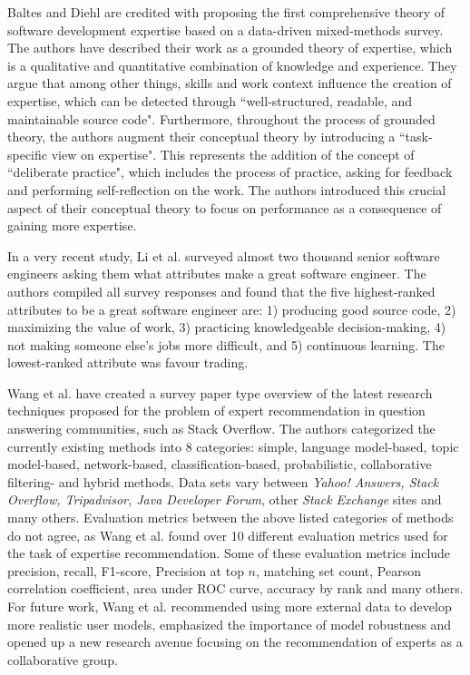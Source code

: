         Baltes and Diehl \cite{baltes2018towards} are credited with proposing the first comprehensive theory of software development expertise based on a data-driven mixed-methods survey. The authors have described their work as a grounded theory of expertise, which is a qualitative and quantitative combination of knowledge and experience. They argue that among other things, skills and work context influence the creation of expertise, which can be detected through ``well-structured, readable, and maintainable source code". Furthermore, throughout the process of grounded theory, the authors augment their conceptual theory by introducing a ``task-specific view on expertise". This represents the addition of the concept of ``deliberate practice", which includes the process of practice, asking for feedback and performing self-reflection on the work. The authors introduced this crucial aspect of their conceptual theory to focus on performance as a consequence of gaining more expertise.
        
        In a very recent study, Li et al. \cite{li2019distinguishes} surveyed almost two thousand senior software engineers asking them what attributes make a great software engineer. The authors compiled all survey responses and found that the five highest-ranked attributes to be a great software engineer are: 1) producing good source code, 2) maximizing the value of work, 3) practicing knowledgeable decision-making, 4) not making someone else's jobs more difficult, and 5) continuous learning. The lowest-ranked attribute was favour trading.
       
        Wang et al. \cite{wang2018survey} have created a survey paper type overview of the latest research techniques proposed for the problem of expert recommendation in question answering communities, such as Stack Overflow. The authors categorized the currently existing methods into 8 categories: simple, language model-based, topic model-based, network-based, classification-based, probabilistic, collaborative filtering- and hybrid methods. Data sets vary between \emph{Yahoo! Answers, Stack Overflow, Tripadvisor, Java Developer Forum}, other \emph{Stack Exchange} sites and many others. Evaluation metrics between the above listed categories of methods do not agree, as Wang et al. found over 10 different evaluation metrics used for the task of expertise recommendation. Some of these evaluation metrics include precision, recall, F1-score, Precision at top $n$, matching set count, Pearson correlation coefficient, area under ROC curve, accuracy by rank and many others. For future work, Wang et al. recommended using more external data to develop more realistic user models, emphasized the importance of model robustness and opened up a new research avenue focusing on the recommendation of experts as a collaborative group.
        
